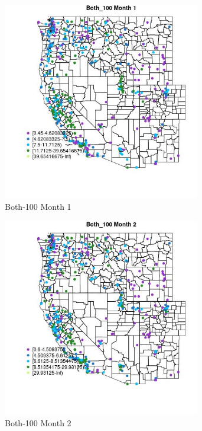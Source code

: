 \begin{figure} 
\centering  
\includegraphics[width=0.77\textwidth]{Code_Outputs/ML_input_report_ML_input_PM25_Step5_part_d_de_duplicated_aves_ML_input_MapObsMo1Both_100.jpg} 
\caption{\label{fig:ML_input_report_ML_input_PM25_Step5_part_d_de_duplicated_aves_ML_inputMapObsMo1Both_100}Both-100 Month 1} 
\end{figure} 
 

\begin{figure} 
\centering  
\includegraphics[width=0.77\textwidth]{Code_Outputs/ML_input_report_ML_input_PM25_Step5_part_d_de_duplicated_aves_ML_input_MapObsMo2Both_100.jpg} 
\caption{\label{fig:ML_input_report_ML_input_PM25_Step5_part_d_de_duplicated_aves_ML_inputMapObsMo2Both_100}Both-100 Month 2} 
\end{figure} 
 

